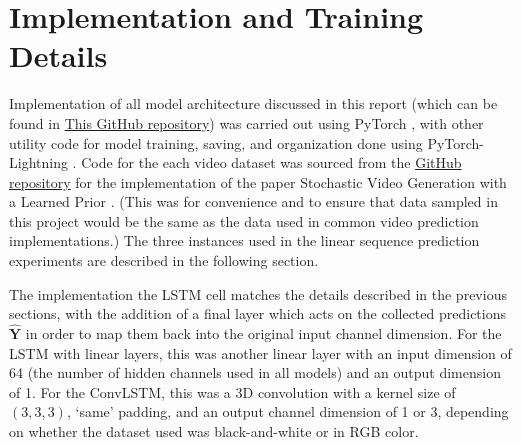 \documentclass{scrartcl}
\begin{document}
%
%
%
%

\newpage 
\section{Implementation and Training Details}
\label{sec:details}

Implementation of all model architecture discussed in this report (which can be
found in \href{https://github.com/msc5/junior-iw}{This GitHub repository}) was
carried out using PyTorch \cite{pytorch}, with other utility code for model
training, saving, and organization done using PyTorch-Lightning
\cite{pytorch_lightning}. Code for the each video dataset 
was sourced from the \href{https://github.com/edenton/svg}{GitHub repository}
for the implementation of the paper Stochastic Video Generation with a Learned
Prior \cite{svg_dataloaders}. (This was for convenience and to ensure that data
sampled in this project would be the same as the data used in common video
prediction implementations.) The three  instances used in
the linear sequence prediction experiments are described in the following
section.

The implementation the LSTM cell matches the details described in the previous
sections, with the addition of a final layer which acts on the collected
predictions $\hat{\boldsymbol{Y}}$ in order to map them back into the original
input channel dimension. For the LSTM with linear layers, this was another
linear layer with an input dimension of 64 (the number of hidden channels used
in all models) and an output dimension of 1. For the ConvLSTM, this was a 3D
convolution with a kernel size of $(3, 3, 3)$, `same' padding, and an output
channel dimension of 1 or 3, depending on whether the dataset used was
black-and-white or in RGB color.
\end{document}
